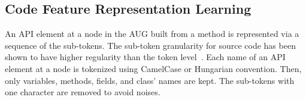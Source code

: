 \subsection{Code Feature Representation Learning}
\label{sec:features}

An API element at a node in the AUG built from a method is represented
via a sequence of the sub-tokens. The sub-token granularity for source
code has been shown to have higher regularity than the token
level~\cite{icse20-methodname}. Each name of an API element at a node
is tokenized using CamelCase or Hungarian convention. Then, only
variables, methods, fields, and class' names are kept. The sub-tokens
with one character are removed to avoid noises.

